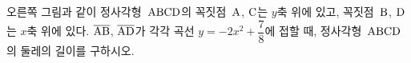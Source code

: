 \noindent\begin{minipage}[t]{0.58\linewidth}\vspace{0pt}\raggedright 오른쪽 그림과 같이 정사각형~$\mathrm{ABCD}$의 꼭짓점~$\mathrm{A}$, $\mathrm{C}$는 $y$축 위에 있고, 꼭짓점~$\mathrm{B}$, $\mathrm{D}$는 $x$축 위에 있다. $\overline{\mathrm{AB}}$, $\overline{\mathrm{AD}}$가 각각 곡선 $y=-2x^2+\dfrac{7}{8}$에 접할 때, 정사각형~$\mathrm{ABCD}$의 둘레의 길이를 구하시오.\end{minipage}\hfill\begin{minipage}[t]{0.4\linewidth}\vspace{0pt}\centering \resizebox{\ifdim\width>\linewidth\linewidth\else\width\fi}{!}{}\end{minipage}\par
